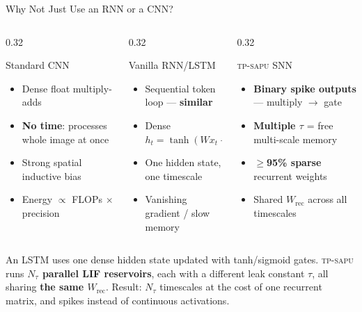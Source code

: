 \documentclass[aspectratio=169,11pt]{beamer}
\newcommand{\hl}[1]{{\color{highlight}\textbf{#1}}}
\newcommand{\tpsapu}{\textsc{tp-sapu}}
\begin{document}
\begin{frame}{Why Not Just Use an RNN or a CNN?}
\begin{columns}[T]
\begin{column}{0.32\textwidth}
  \begin{block}{Standard CNN}
    \begin{itemize}\small
      \item Dense float multiply-adds
      \item \textbf{No time}: processes whole image at once
      \item Strong spatial inductive bias
      \item Energy $\propto$ FLOPs $\times$ precision
    \end{itemize}
  \end{block}
\end{column}
\begin{column}{0.32\textwidth}
  \begin{alertblock}{Vanilla RNN/LSTM}
    \begin{itemize}\small
      \item Sequential token loop — \hl{similar}
      \item Dense $h_t = \tanh(Wx_t + Uh_{t-1})$
      \item One hidden state, one timescale
      \item Vanishing gradient / slow memory
    \end{itemize}
  \end{alertblock}
\end{column}
\begin{column}{0.32\textwidth}
  \begin{exampleblock}{\tpsapu{} SNN}
    \begin{itemize}\small
      \item \hl{Binary spike outputs} — multiply $\to$ gate
      \item \hl{Multiple $\tau$} = free multi-scale memory
      \item \hl{$\geq$95\% sparse} recurrent weights
      \item Shared $W_\text{rec}$ across all timescales
    \end{itemize}
  \end{exampleblock}
\end{column}
\end{columns}
\vspace{0.4em}
\begin{tcolorbox}[mybox,title=Key difference from RNNs]
  \small An LSTM uses one dense hidden state updated with tanh/sigmoid gates.
  \tpsapu{} runs \hl{$N_\tau$ parallel LIF reservoirs}, each with a different leak
  constant $\tau$, all sharing \hl{the same $W_\text{rec}$}.
  Result: $N_\tau$ timescales at the cost of one recurrent matrix,
  and spikes instead of continuous activations.
\end{tcolorbox}
\end{frame}
\end{document}
